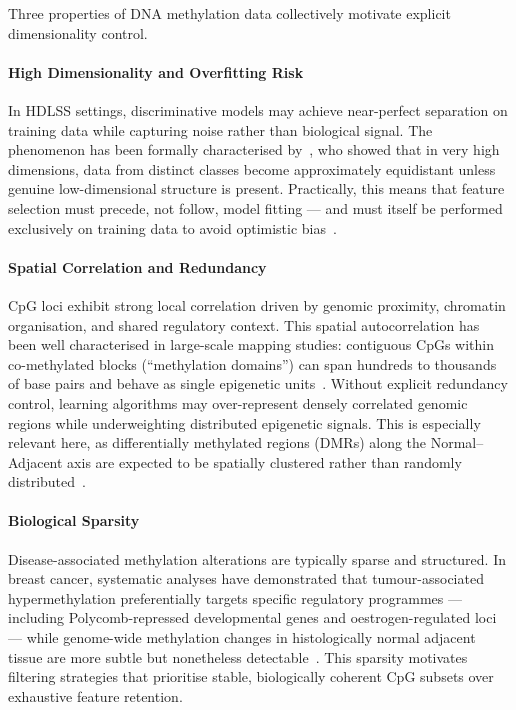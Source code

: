 Three properties of DNA methylation data collectively motivate explicit 
dimensionality control.

\paragraph{High Dimensionality and Overfitting Risk}
In HDLSS settings, discriminative models may achieve near-perfect separation 
on training data while capturing noise rather than biological signal. The 
phenomenon has been formally characterised by~\cite{Hall2005}, who showed 
that in very high dimensions, data from distinct classes become approximately 
equidistant unless genuine low-dimensional structure is present. Practically, 
this means that feature selection must precede, not follow, model fitting — 
and must itself be performed exclusively on training data to avoid 
optimistic bias~\cite{Ambroise2002}.

\paragraph{Spatial Correlation and Redundancy}
CpG loci exhibit strong local correlation driven by genomic proximity, 
chromatin organisation, and shared regulatory context. This spatial 
autocorrelation has been well characterised in large-scale mapping studies: 
contiguous CpGs within co-methylated blocks (``methylation domains'') 
can span hundreds to thousands of base pairs and behave as single 
epigenetic units~\cite{Hansen2011, Aryee2014}. Without explicit redundancy 
control, learning algorithms may over-represent densely correlated genomic 
regions while underweighting distributed epigenetic signals. This is 
especially relevant here, as differentially methylated regions (DMRs) 
along the Normal–Adjacent axis are expected to be spatially clustered 
rather than randomly distributed~\cite{Luo2018}.

\paragraph{Biological Sparsity}
Disease-associated methylation alterations are typically sparse and 
structured. In breast cancer, systematic analyses have demonstrated that 
tumour-associated hypermethylation preferentially targets specific regulatory 
programmes — including Polycomb-repressed developmental genes and 
oestrogen-regulated loci — while genome-wide methylation changes in 
histologically normal adjacent tissue are more subtle but nonetheless 
detectable~\cite{Teschendorff2016, Fleischer2017}. This sparsity 
motivates filtering strategies that prioritise stable, biologically 
coherent CpG subsets over exhaustive feature retention.

